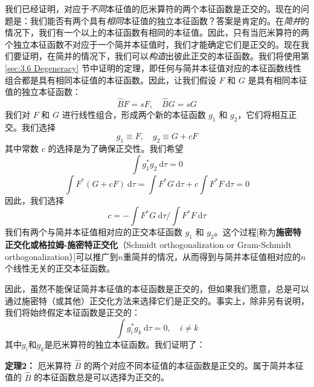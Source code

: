     我们已经证明，对应于\textit{不同}本征值的厄米算符的两个本征函数是正交的。现在的问题是：我们能否有两个具有\textit{相同}本征值的独立本征函数？答案是肯定的。在\textit{简并}的情况下，我们有一个以上的本征函数有相同的本征值。因此，只有当厄米算符的两个独立本征函数不对应于一个简并本征值时，我们才能确定它们是正交的。现在我们要证明，在简并的情况下，我们可以\textit{构造}出彼此正交的本征函数。我们将使用第 \ref{sec:3.6 Degeneracy} 节中证明的定理，即任何与简并本征值对应的本征函数线性组合都是具有相同本征值的本征函数。因此，让我们假设 $F$ 和 $G$ 是具有相同本征值的独立本征函数：
    \begin{equation*}
        \hat{B}F = sF, \quad \hat{B}G = sG
    \end{equation*}
    我们对 $F$ 和 $G$ 进行线性组合，形成两个新的本征函数 $g_1$ 和 $g_2$，它们将相互正交。我们选择
    \begin{equation*}
        g_1 \equiv F, \quad g_2 \equiv G + cF
    \end{equation*}
    其中常数 $c$ 的选择是为了确保正交性。我们希望
    \begin{equation*}
        \int g_1^{\ast} g_2 \:\mathrm{d}\tau = 0
    \end{equation*}
    \begin{equation*}
        \int F^{\ast} \left(G + cF\right) \:\mathrm{d}\tau = \int F^{\ast} G \:\mathrm{d}\tau + c \int F^{\ast} F \:\mathrm{d}\tau = 0
    \end{equation*}
    因此，我们选择
    \begin{equation}
        c = -\int F^{\ast} G \:\mathrm{d}\tau \Big/ \int F^{\ast} F \:\mathrm{d}\tau
        \label{eq:7.23}
    \end{equation}
    我们有两个与简并本征值相对应的正交本征函数 $g_1$ 和 $g_2$。这个过程[称为\textbf{施密特正交化或格拉姆-施密特正交化}（Schmidt orthogonalization or Gram-Schmidt orthogonalization）]可以推广到$n$重简并的情况，从而得到与简并本征值相对应的$n$个线性无关的正交本征函数。

    因此，虽然不能保证简并本征值的本征函数是正交的，但如果我们愿意，总是可以通过施密特（或其他）正交化方法来选择它们是正交的。事实上，除非另有说明，我们将始终假定本征函数是正交的：
    \begin{equation}
        \int g_i^{\ast} g_k \:\mathrm{d}\tau = 0, \quad i \neq k
        \label{eq:7.24}
    \end{equation}
    其中$g_i$和$g_k$是厄米算符的独立本征函数。我们证明了：
    \begin{center}
        \parbox{0.8\textwidth}{
            \textbf{定理2：} 厄米算符 $\hat{B}$ 的两个对应不同本征值的本征函数是正交的。属于简并本征值的 $\hat{B}$ 的本征函数总是可以选择为正交的。
        }
    \end{center}

